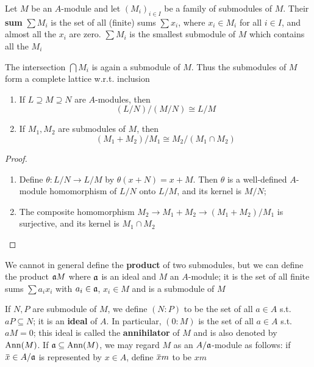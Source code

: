 \documentclass[11pt]{article}
\begin{document}
Let \(M\) be an \(A\)-module and let \((M_i)_{i\in I}\) be a family of submodules of \(M\). Their
\textbf{sum} \(\sum M_i\) is the set of all (finite) sums \(\sum x_i\), where \(x_i\in M_i\) for all \(i\in I\), and
almost all the \(x_i\) are zero. \(\sum M_i\) is the smallest submodule of \(M\) which contains all
the \(M_i\)

The intersection \(\bigcap M_i\) is again a submodule of \(M\). Thus the submodules of \(M\) form a
complete lattice w.r.t. inclusion

\begin{proposition}[]
\begin{enumerate}
\item If \(L\supseteq M\supseteq N\) are \(A\)-modules, then
\begin{equation*}
(L/N)/(M/N)\cong L/M
\end{equation*}
\item If \(M_1,M_2\) are submodules of \(M\), then
\begin{equation*}
(M_1+M_2)/M_1\cong M_2/(M_1\cap M_2)
\end{equation*}
\end{enumerate}
\end{proposition}

\begin{proof}
\begin{enumerate}
\item Define \(\theta:L/N\to L/M\) by \(\theta(x+N)=x+M\). Then \(\theta\) is a well-defined \(A\)-module homomorphism
of \(L/N\) onto \(L/M\), and its kernel is \(M/N\);
\item The composite homomorphism \(M_2\to M_1+M_2\to(M_1+M_2)/M_1\) is surjective, and its kernel
is \(M_1\cap M_2\)
\end{enumerate}
\end{proof}

We cannot in general define the \textbf{product} of two submodules, but we can define the product \(\mathfrak{a} M\)
where \(\mathfrak{a}\) is an ideal and \(M\) an \(A\)-module; it is the set of all finite sums \(\sum a_ix_i\)
with \(a_i\in\mathfrak{a}\), \(x_i\in M\) and is a submodule of \(M\)

If \(N,P\) are submodule of \(M\), we define \((N:P)\) to be the set of all \(a\in A\)
s.t. \(aP\subseteq N\); it is an \textbf{ideal} of \(A\). In particular, \((0:M)\) is the set of all \(a\in A\)
s.t. \(aM=0\); this ideal is called the \textbf{annihilator} of \(M\) and is also denoted by \(\operatorname{Ann}(M)\).
If \(\mathfrak{a}\subseteq\operatorname{Ann}(M)\), we may regard \(M\) as an \(A/\mathfrak{a}\)-module as follows: if \(\barx\in A/\fa\) is
represented by \(x\in A\), define \(\barx m\) to be \(xm\)
\end{document}
